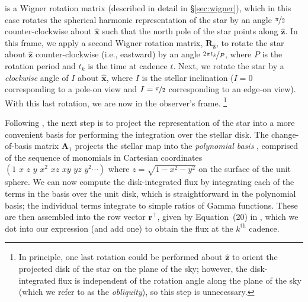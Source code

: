 \documentclass[modern,linenumbers]{aastex62}
\begin{document}
is a Wigner rotation matrix
(described in detail in \S\ref{sec:wigner}),
which in this case rotates the spherical harmonic representation
of the star by an angle $\nicefrac{\pi}{2}$ counter-clockwise about $\hat{\mathbf{x}}$
such that the north pole of the star points along $\hat{\mathbf{z}}$. In this
frame, we apply a second Wigner rotation matrix, $\mathbf{R}_{\hat{\mathbf{z}}}$,
to rotate the star about $\hat{\mathbf{z}}$ counter-clockwise (i.e., eastward) by an angle
$\nicefrac{2\pi t_k}{P}$, where $P$ is the rotation period and $t_k$ is the
time at cadence $t$.
Next, we rotate the star by a \emph{clockwise} angle of $I$ about $\hat{\mathbf{x}}$,
where $I$ is the stellar inclination ($I = 0$ corresponding to a pole-on view and
$I = \nicefrac{\pi}{2}$ corresponding to an edge-on view). With this last rotation,
we are now in the observer's frame.%
\footnote{In principle, one last rotation could be performed about $\hat{\mathbf{z}}$
    to orient the projected disk of the star on the plane of the sky; however, the disk-integrated
    flux is independent of the rotation angle along the plane of the sky
    (which we refer to as the \emph{obliquity}), so this step is unnecessary.}

Following \citet{Luger2019}, the next step is to project the representation of
the star into a more convenient basis for performing the integration over the stellar
disk. The change-of-basis matrix $\mathbf{A}_1$ \citep[see Appendix~B in][]{Luger2019}
projects the stellar map into the \emph{polynomial basis}
\citep[Equation~7 in][]{Luger2019}, comprised of the sequence of monomials in Cartesian
coordinates
$\left( 1 \,\, x \,\, z \,\, y \,\, x^2 \,\, xz \,\, xy \,\, yz \,\, y^2 \cdots \right)$
where $z = \sqrt{1 - x^2 - y^2}$ on the surface of the unit sphere. We
can now compute the disk-integrated flux by integrating each of the terms in the basis
over the unit disk, which is straightforward in the polynomial basis; the
individual terms integrate to simple ratios of Gamma functions. These are then
assembled into the row vector $\mathbf{r}^\top$, given by Equation~(20) in
\citet{Luger2019}, which we dot into our expression (and add one) to obtain the
flux at the $k^\mathrm{th}$ cadence.
\end{document}
